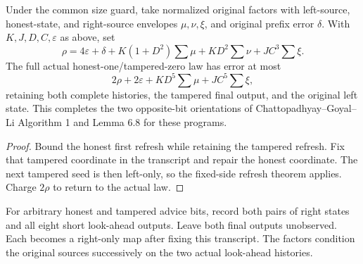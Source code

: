 \begin{theorem}
  \label{thm:lowerbounds-algebraic-opposite-flipflop-true}
  \leanok
  Under the common size guard, take normalized original factors with
  left-source, honest-state, and right-source envelopes $\mu,\nu,\xi$,
  and original prefix error $\delta$. With $K,J,D,C,\varepsilon$ as
  above, set
  \[
    \rho=4\varepsilon+\delta+K(1+D^2)\sum\mu+
      KD^2\sum\nu+JC^3\sum\xi.
  \]
  The full actual honest-one/tampered-zero law has error at most
  \[
    2\rho+2\varepsilon+KD^5\sum\mu+JC^5\sum\xi,
  \]
  retaining both complete histories, the tampered final output, and the
  original left state. This completes the two opposite-bit orientations
  of Chattopadhyay--Goyal--Li Algorithm 1 and Lemma 6.8 for these programs.
\end{theorem}
\begin{proof}
  \leanok
  Bound the honest first refresh while retaining the tampered refresh.
  Fix that tampered coordinate in the transcript and repair the honest
  coordinate. The next tampered seed is then left-only, so the fixed-side
  refresh theorem applies. Charge $2\rho$ to return to the actual law.
\end{proof}

\begin{definition}
  \label{def:lowerbounds-algebraic-flipflop-transcript}
  \leanok
  For arbitrary honest and tampered advice bits, record both pairs of
  right states and all eight short look-ahead outputs. Leave both final
  outputs unobserved. Each becomes a right-only map after fixing this
  transcript. The factors condition the original sources successively
  on the two actual look-ahead histories.
\end{definition}

